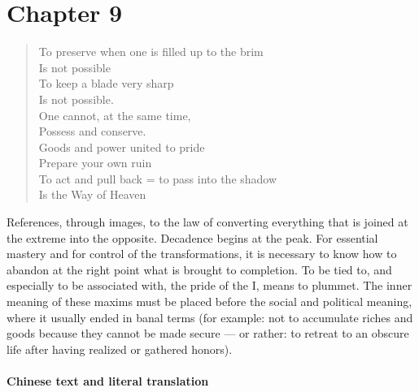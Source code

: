 \section{Chapter 9}

\begin{verse}
To preserve when one is filled up to the brim\\
Is not possible\\
To keep a blade very sharp\\
Is not possible.\\
One cannot, at the same time,\\
Possess and conserve.\\
Goods and power united to pride\\
Prepare your own ruin\\
To act and pull back = to pass into the shadow \\
Is the Way of Heaven
\end{verse}

References, through images, to the law of converting everything that is joined at the extreme into the opposite. Decadence begins at the peak. For essential mastery and for control of the transformations, it is necessary to know how to abandon at the right point what is brought to completion. To be tied to, and especially to be associated with, the pride of the I, means to plummet. The inner meaning of these maxims must be placed before the social and political meaning, where it usually ended in banal terms (for example: not to accumulate riches and goods because they cannot be made secure --- or rather: to retreat to an obscure life after having realized or gathered honors).

\paragraph{Chinese text and literal translation}


